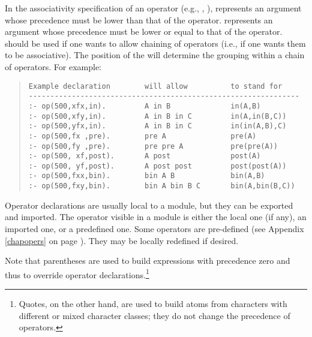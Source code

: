 In the associativity specification of an operator (e.g., ,
), 
represents an argument whose precedence must be lower than that of the
operator.   represents an argument whose precedence must be lower or
equal to that of the operator.   should be used if one wants to
allow
chaining of operators (i.e., if one wants them to be associative).  The position
of the  will determine the
grouping within a chain of operators. For example:
\begin{quote}
\begin{verbatim}
Example declaration        will allow          to stand for
---------------------------------------------------------------
:- op(500,xfx,in).         A in B              in(A,B)
:- op(500,xfy,in).         A in B in C         in(A,in(B,C))
:- op(500,yfx,in).         A in B in C         in(in(A,B),C)
:- op(500,fx ,pre).        pre A               pre(A)
:- op(500,fy ,pre).        pre pre A           pre(pre(A))
:- op(500, xf,post).       A post              post(A)
:- op(500, yf,post).       A post post         post(post(A))
:- op(500,fxx,bin).        bin A B             bin(A,B)
:- op(500,fxy,bin).        bin A bin B C       bin(A,bin(B,C))
\end{verbatim}
\end{quote}

Operator declarations are usually local to a module, but they can be
exported and imported.  The operator visible in a module is either the
local one (if any), an imported one, or a predefined one.
Some operators are pre-defined (see Appendix \ref{chapopers} on
page \pageref{chapopers}).  They may be locally redefined if desired.

Note that parentheses are used to build expressions with precedence zero
and thus to override operator declarations.\footnote{%
  Quotes, on the other hand, are used to build atoms from characters
  with different or mixed character classes; they do not change
  the precedence of operators.}


